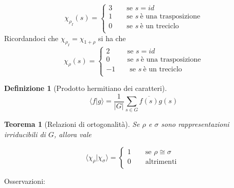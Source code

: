\documentclass[11pt]{article}
\theoremstyle{plain}
\newtheorem{thm}{Teorema}[section]
\theoremstyle{definition}
\newtheorem{defn}{Definizione}[section]
\theoremstyle{remark}
\newcommand{\dsum}{\displaystyle\sum}
\begin{document}
\[ \chi_{\rho_I}(s) = \begin{cases}
3 \qquad \text{se } s=id \\
1 \qquad \text{se } s\ \text{è una trasposizione}\\
0 \qquad \text{se } s\ \text{è un treciclo}\\
\end{cases} \]
Ricordandoci che $\chi_{\rho_I}=\chi_{1+\rho}$ si ha che 
\[ \chi_{\rho}(s) = \begin{cases}
2 \qquad \ \ \text{se } s=id \\
0 \qquad \ \ \text{se } s\ \text{è una trasposizione}\\
-1\qquad \text{se } s\ \text{è un treciclo}\\
\end{cases} \]

\begin{defn}[Prodotto hermitiano dei caratteri]

\[ \langle f | g \rangle = \dfrac{1}{|G|} \dsum_{s \in G} \overline{f(s)} g(s) \]

\end{defn}


\begin{thm}[Relazioni di ortogonalità]
Se $\rho$ e $\sigma$ sono rappresentazioni irriducibili di $G$, allora vale

\[\langle \chi_{\rho}|\chi_{\sigma} \rangle = \begin{cases}
1 \qquad \text{se } \rho \cong \sigma \\
0 \qquad \text{altrimenti }\\
\end{cases} \]

\end{thm}

Osservazioni:
\end{document}
